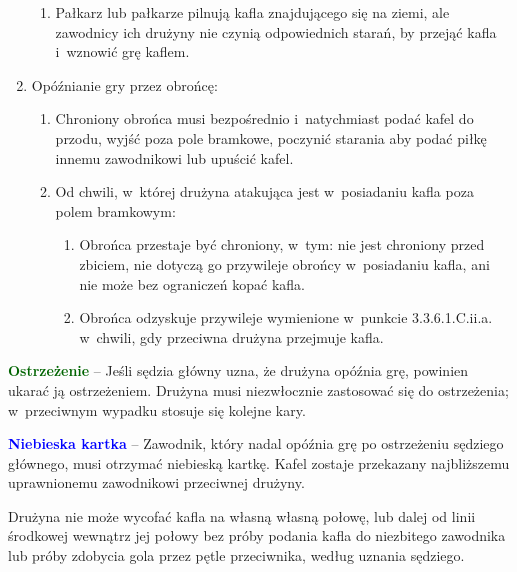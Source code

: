 \documentclass[12pt,a4paper]{article}
\renewcommand{\paragraph}[1]{
  \oldparagraph{#1}%
  \leftskip2cm
}
\newcommand\bluecard[1]{\bgroup\textcolor{blue}{\textbf{#1}}}
\newcommand\other[1]{\bgroup\textcolor{darkgreen}{\textbf{#1}}}
\begin{document}
\begin{enumerate}
\begin{enumerate}
		      \item Pałkarz lub pałkarze pilnują kafla znajdującego się na ziemi, ale
		            zawodnicy ich drużyny nie czynią odpowiednich starań, by przejąć kafla i~wznowić grę kaflem.
	      \end{enumerate}

	\item Opóźnianie gry przez obrońcę:
	      \begin{enumerate}
		      \item Chroniony obrońca musi bezpośrednio i~natychmiast podać
		            kafel do przodu, wyjść poza pole bramkowe, poczynić starania aby
		            podać piłkę innemu zawodnikowi lub upuścić kafel.

		      \item Od chwili, w~której drużyna atakująca jest w~posiadaniu kafla poza
		            polem bramkowym:
		            \begin{enumerate}
			            \item Obrońca przestaje być chroniony, w~tym: nie jest chroniony przed
			                  zbiciem, nie dotyczą go przywileje obrońcy w~posiadaniu kafla, ani nie
			                  może bez ograniczeń kopać kafla.

			            \item Obrońca odzyskuje przywileje wymienione w~punkcie 3.3.6.1.C.ii.a.
			                  w~chwili, gdy przeciwna drużyna przejmuje kafla.
		            \end{enumerate}
	      \end{enumerate}
\end{enumerate}

\other{Ostrzeżenie} -- Jeśli sędzia główny uzna, że drużyna
opóźnia grę, powinien ukarać ją ostrzeżeniem. Drużyna musi
niezwłocznie zastosować się do ostrzeżenia; w~przeciwnym wypadku stosuje
się kolejne kary.

\bluecard{Niebieska kartka} -- Zawodnik, który nadal opóźnia grę po
ostrzeżeniu sędziego głównego, musi otrzymać niebieską kartkę. Kafel
zostaje przekazany najbliższemu uprawnionemu zawodnikowi przeciwnej
drużyny.

\paragraph{Wycofanie}
Drużyna nie może wycofać kafla na własną
własną połowę, lub dalej od linii środkowej wewnątrz jej połowy bez
próby podania kafla do niezbitego zawodnika lub próby zdobycia
gola przez pętle przeciwnika, według uznania sędziego.
\end{document}
